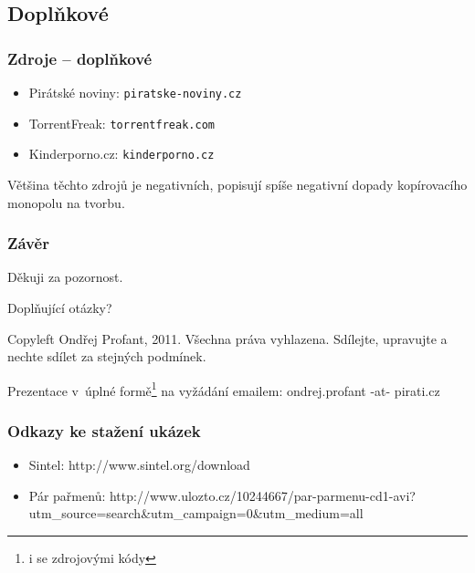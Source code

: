 \documentclass[xetex]{beamer}
\begin{document}
\subsection{Doplňkové}

\begin{frame}
  \frametitle{Zdroje -- doplňkové}
  \begin{itemize}
	\item Pirátské noviny: \texttt{piratske-noviny.cz}
	\item TorrentFreak: \texttt{torrentfreak.com}
	\item Kinderporno.cz: \texttt{kinderporno.cz}
  \end{itemize}
Většina těchto zdrojů je negativních, popisují spíše negativní dopady kopírovacího monopolu na tvorbu. 
\end{frame}

\begin{frame}
  \frametitle{Závěr}
	Děkuji za pozornost.

	\bigskip
	
	Doplňující otázky?

\bigskip

\bigskip

\scriptsize
Copyleft Ondřej Profant, 2011. Všechna práva vyhlazena. Sdílejte, upravujte a nechte sdílet za stejných podmínek. 

Prezentace v~úplné formě\footnote{i se zdrojovými kódy} na vyžádání emailem: ondrej.profant -at- pirati.cz 
\end{frame}

\begin{frame}
 \frametitle{Odkazy ke stažení ukázek}
 \begin{itemize}
  \item Sintel: http://www.sintel.org/download
  \item Pár pařmenů: http://www.ulozto.cz/10244667/par-parmenu-cd1-avi?utm\_source=search\&utm\_campaign=0\&utm\_medium=all
 \end{itemize}
\end{frame}
\end{document}
